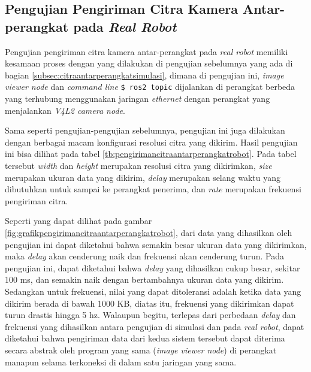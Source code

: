 \subsection{Pengujian Pengiriman Citra Kamera Antar-perangkat pada \emph{Real Robot}}
\label{subsec:citraantarperangkatrobot}

Pengujian pengiriman citra kamera antar-perangkat pada \emph{real robot} memiliki kesamaan proses dengan yang dilakukan di pengujian sebelumnya yang ada di bagian \ref{subsec:citraantarperangkatsimulasi},
  dimana di pengujian ini, \emph{image viewer node} dan \emph{command line} \lstinline{$ ros2 topic} dijalankan di perangkat berbeda yang terhubung menggunakan jaringan \emph{ethernet} dengan perangkat yang menjalankan \emph{V4L2 camera node}.

Sama seperti pengujian-pengujian sebelumnya,
  pengujian ini juga dilakukan dengan berbagai macam konfigurasi resolusi citra yang dikirim.
Hasil pengujian ini bisa dilihat pada tabel \ref{tb:pengirimancitraantarperangkatrobot}.
Pada tabel tersebut \emph{width} dan \emph{height} merupakan resolusi citra yang dikirimkan,
  \emph{size} merupakan ukuran data yang dikirim,
  \emph{delay} merupakan selang waktu yang dibutuhkan untuk sampai ke perangkat penerima,
  dan \emph{rate} merupakan frekuensi pengiriman citra.





Seperti yang dapat dilihat pada gambar \ref{fig:grafikpengirimancitraantarperangkatrobot},
  dari data yang dihasilkan oleh pengujian ini dapat diketahui bahwa semakin besar ukuran data yang dikirimkan,
  maka \emph{delay} akan cenderung naik dan frekuensi akan cenderung turun.
Pada pengujian ini, dapat diketahui bahwa \emph{delay} yang dihasilkan cukup besar,
  sekitar 100 ms, dan semakin naik dengan bertambahnya ukuran data yang dikirim.
Sedangkan untuk frekuensi,
  nilai yang dapat ditoleransi adalah ketika data yang dikirim berada di bawah 1000 KB,
  diatas itu, frekuensi yang dikirimkan dapat turun drastis hingga 5 hz.
Walaupun begitu, terlepas dari perbedaan \emph{delay} dan frekuensi yang dihasilkan antara pengujian di simulasi dan pada \emph{real robot},
  dapat diketahui bahwa pengiriman data dari kedua sistem tersebut dapat diterima secara abstrak oleh program yang sama (\emph{image viewer node}) di perangkat manapun selama terkoneksi di dalam satu jaringan yang sama.
